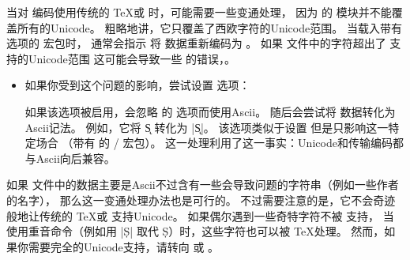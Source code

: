 当对 \utf 编码使用传统的 \TeX 或 \pdfTeX 时，可能需要一些变通处理，
因为  的  模块并不能覆盖所有的Unicode。
粗略地讲，它只覆盖了西欧字符的Unicode范围。
当载入带有  选项的  宏包时，
\biblatex 通常会指示 \biber 将  数据重新编码为 \utf。
如果  文件中的字符超出了  支持的Unicode范围
这可能会导致一些  的错误，。

\begin{itemize}

\item
如果你受到这个问题的影响，尝试设置  选项：

\begin{ltxexample}
\usepackage[utf8]{inputenc}
\usepackage[safeinputenc]{biblatex}
\end{ltxexample}
%
如果该选项被启用，\biblatex 会忽略  的  选项而使用Ascii。
\biber 随后会尝试将  数据转化为Ascii记法。
例如，它将 \k{S} 转化为 |\k{S}|。
该选项类似于设置  但是只影响这一特定场合
（带有 \utf 的 \slash {} 宏包）。
这一处理利用了这一事实：Unicode和\utf 传输编码都与Ascii向后兼容。

\end{itemize}


如果  文件中的数据主要是Ascii不过含有一些会导致问题的字符串（例如一些作者的名字），
那么这一变通处理办法也是可行的。
不过需要注意的是，它不会奇迹般地让传统的 \TeX 或 \pdfTeX 支持Unicode。
如果偶尔遇到一些奇特字符不被  支持，
当使用重音命令（例如用 |\d{S}| 取代 \d{S}）时，这些字符也可以被 \TeX 处理。
然而，如果你需要完全的Unicode支持，请转向 \XeTeX 或 \LuaTeX 。

